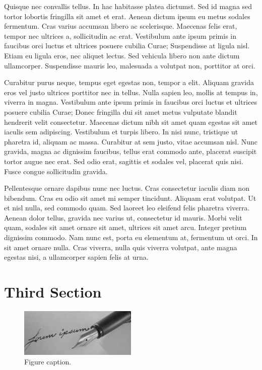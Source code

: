 Quisque nec convallis tellus. In hac habitasse platea dictumst. Sed id magna sed tortor lobortis fringilla sit amet et erat. Aenean dictum ipsum eu metus sodales fermentum. Cras varius accumsan libero ac scelerisque. Maecenas felis erat, tempor nec ultrices a, sollicitudin ac erat. Vestibulum ante ipsum primis in faucibus orci luctus et ultrices posuere cubilia Curae; Suspendisse at ligula nisl. Etiam eu ligula eros, nec aliquet lectus. Sed vehicula libero non ante dictum ullamcorper. Suspendisse mauris leo, malesuada a volutpat non, porttitor at orci. 


Curabitur purus neque, tempus eget egestas non, tempor a elit. Aliquam gravida eros vel justo ultrices porttitor nec in tellus. Nulla sapien leo, mollis at tempus in, viverra in magna. Vestibulum ante ipsum primis in faucibus orci luctus et ultrices posuere cubilia Curae; Donec fringilla dui sit amet metus vulputate blandit hendrerit velit consectetur. Maecenas dictum nibh sit amet quam egestas sit amet iaculis sem adipiscing. Vestibulum et turpis libero. In nisi nunc, tristique ut pharetra id, aliquam ac massa. Curabitur at sem justo, vitae accumsan nisl. Nunc gravida, magna ac dignissim faucibus, tellus erat commodo ante, placerat suscipit tortor augue nec erat. Sed odio erat, sagittis et sodales vel, placerat quis nisi. Fusce congue sollicitudin gravida. 






Pellentesque ornare dapibus nunc nec luctus. Cras consectetur iaculis diam non bibendum. Cras eu odio sit amet mi semper tincidunt. Aliquam erat volutpat. Ut et nisl nulla, sed commodo quam. Sed laoreet leo eleifend felis pharetra viverra. Aenean dolor tellus, gravida nec varius ut, consectetur id mauris. Morbi velit quam, sodales sit amet ornare sit amet, ultrices sit amet arcu. Integer pretium dignissim commodo. Nam nunc est, porta eu elementum at, fermentum ut orci. In sit amet ornare nulla. Cras viverra, nulla quis viverra volutpat, ante magna egestas nisi, a ullamcorper sapien felis at urna. 




\section{Third Section}

\begin{figure}[]
\begin{center}
\includegraphics[width=0.5\textwidth]{01x03}
\end{center}
\caption{Figure caption.}
\end{figure}

